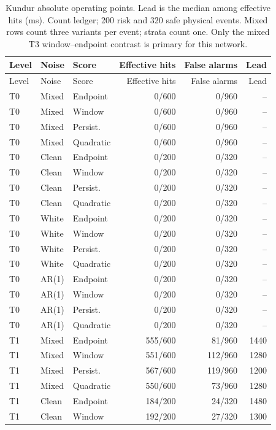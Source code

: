 \documentclass[10pt]{article}
\begin{document}
\begingroup\small\setlength{\tabcolsep}{3.8pt}
\begin{longtable}{lllrrr}
\caption{Kundur absolute operating points. Lead is the median among effective hits (ms). Count ledger; 200 risk and 320 safe physical events. Mixed rows count three variants per event; strata count one. Only the mixed T3 window--endpoint contrast is primary for this network.}\\
\toprule Level & Noise & Score & Effective hits & False alarms & Lead \\\midrule\endfirsthead
\toprule Level & Noise & Score & Effective hits & False alarms & Lead \\\midrule\endhead
T0 & Mixed & Endpoint & 0/600 & 0/960 & -- \\
T0 & Mixed & Window & 0/600 & 0/960 & -- \\
T0 & Mixed & Persist. & 0/600 & 0/960 & -- \\
T0 & Mixed & Quadratic & 0/600 & 0/960 & -- \\
T0 & Clean & Endpoint & 0/200 & 0/320 & -- \\
T0 & Clean & Window & 0/200 & 0/320 & -- \\
T0 & Clean & Persist. & 0/200 & 0/320 & -- \\
T0 & Clean & Quadratic & 0/200 & 0/320 & -- \\
T0 & White & Endpoint & 0/200 & 0/320 & -- \\
T0 & White & Window & 0/200 & 0/320 & -- \\
T0 & White & Persist. & 0/200 & 0/320 & -- \\
T0 & White & Quadratic & 0/200 & 0/320 & -- \\
T0 & AR(1) & Endpoint & 0/200 & 0/320 & -- \\
T0 & AR(1) & Window & 0/200 & 0/320 & -- \\
T0 & AR(1) & Persist. & 0/200 & 0/320 & -- \\
T0 & AR(1) & Quadratic & 0/200 & 0/320 & -- \\
T1 & Mixed & Endpoint & 555/600 & 81/960 & 1440 \\
T1 & Mixed & Window & 551/600 & 112/960 & 1280 \\
T1 & Mixed & Persist. & 567/600 & 119/960 & 1200 \\
T1 & Mixed & Quadratic & 550/600 & 73/960 & 1280 \\
T1 & Clean & Endpoint & 184/200 & 24/320 & 1480 \\
T1 & Clean & Window & 192/200 & 27/320 & 1300 \\

\end{longtable}
\end{document}
